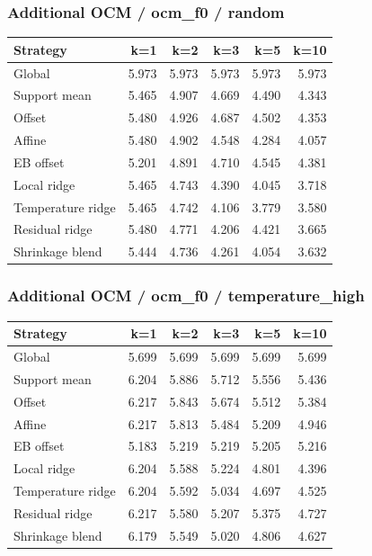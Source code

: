 \subsubsection*{Additional OCM / ocm\_f0 / random}
\begin{center}\small
\begin{tabular}{lrrrrr}
\toprule
Strategy & k=1 & k=2 & k=3 & k=5 & k=10 \\
\midrule
Global & 5.973 & 5.973 & 5.973 & 5.973 & 5.973 \\
Support mean & 5.465 & 4.907 & 4.669 & 4.490 & 4.343 \\
Offset & 5.480 & 4.926 & 4.687 & 4.502 & 4.353 \\
Affine & 5.480 & 4.902 & 4.548 & 4.284 & 4.057 \\
EB offset & 5.201 & 4.891 & 4.710 & 4.545 & 4.381 \\
Local ridge & 5.465 & 4.743 & 4.390 & 4.045 & 3.718 \\
Temperature ridge & 5.465 & 4.742 & 4.106 & 3.779 & 3.580 \\
Residual ridge & 5.480 & 4.771 & 4.206 & 4.421 & 3.665 \\
Shrinkage blend & 5.444 & 4.736 & 4.261 & 4.054 & 3.632 \\
\bottomrule
\end{tabular}
\end{center}

\subsubsection*{Additional OCM / ocm\_f0 / temperature\_high}
\begin{center}\small
\begin{tabular}{lrrrrr}
\toprule
Strategy & k=1 & k=2 & k=3 & k=5 & k=10 \\
\midrule
Global & 5.699 & 5.699 & 5.699 & 5.699 & 5.699 \\
Support mean & 6.204 & 5.886 & 5.712 & 5.556 & 5.436 \\
Offset & 6.217 & 5.843 & 5.674 & 5.512 & 5.384 \\
Affine & 6.217 & 5.813 & 5.484 & 5.209 & 4.946 \\
EB offset & 5.183 & 5.219 & 5.219 & 5.205 & 5.216 \\
Local ridge & 6.204 & 5.588 & 5.224 & 4.801 & 4.396 \\
Temperature ridge & 6.204 & 5.592 & 5.034 & 4.697 & 4.525 \\
Residual ridge & 6.217 & 5.580 & 5.207 & 5.375 & 4.727 \\
Shrinkage blend & 6.179 & 5.549 & 5.020 & 4.806 & 4.627 \\
\bottomrule
\end{tabular}
\end{center}

